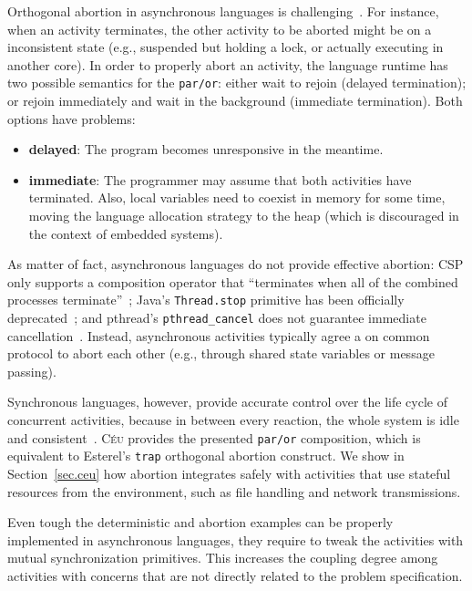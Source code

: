 \documentclass{acm_proc_article-sp}
\newcommand{\CEU}{\textsc{C\'{e}u}\xspace}
\newcommand{\code}[1] {{\small{\texttt{#1}}}}
\newcommand{\1}{\;}
\newcommand{\2}{\;\;}
\newcommand{\3}{\;\;\;}
\newcommand{\5}{\;\;\;\;\;}
\begin{document}
Orthogonal abortion in asynchronous languages is 
challenging~\cite{esterel.preemption}.
%
For instance, when an activity terminates, the other activity to be aborted 
might be on a inconsistent state (e.g., suspended but holding a lock, or 
actually executing in another core).
%
In order to properly abort an activity, the language runtime has two possible 
semantics for the \code{par/or}:
either wait to rejoin (delayed termination);
or rejoin immediately and wait in the background (immediate termination).
Both options have problems:
\begin{itemize}
\item \textbf{delayed}:
    The program becomes unresponsive in the meantime.
\item \textbf{immediate}:
    The programmer may assume that both activities have terminated.
    Also, local variables need to coexist in memory for some time, moving the 
    language allocation strategy to the heap (which is discouraged in the 
context of embedded systems).
\end{itemize}

As matter of fact, asynchronous languages do not provide effective abortion:
CSP only supports a composition operator that ``terminates when all of the 
combined processes terminate''~\cite{async.csp};
Java's \code{Thread.stop} primitive has been officially 
deprecated~\cite{sync_async.threadsstop};
and pthread's \code{pthread\_cancel} does not guarantee immediate 
cancellation~\cite{sync_async.pthreadsstop}.
%
Instead, asynchronous activities typically agree a on common protocol to abort 
each other (e.g., through shared state variables or message passing).

Synchronous languages, however, provide accurate control over the life cycle of 
concurrent activities, because in between every reaction, the whole system is 
idle and consistent~\cite{esterel.preemption}.
%
\CEU provides the presented \code{par/or} composition, which is equivalent to 
Esterel's \code{trap} orthogonal abortion construct.
%
We show in Section~\ref{sec.ceu} how abortion integrates safely with activities 
that use stateful resources from the environment, such as file handling and 
network transmissions.


Even tough the deterministic and abortion examples can be properly implemented 
in asynchronous languages, they require to tweak the activities with mutual
synchronization primitives.
%
This increases the coupling degree among activities with concerns that are not 
directly related to the problem specification.
\end{document}
